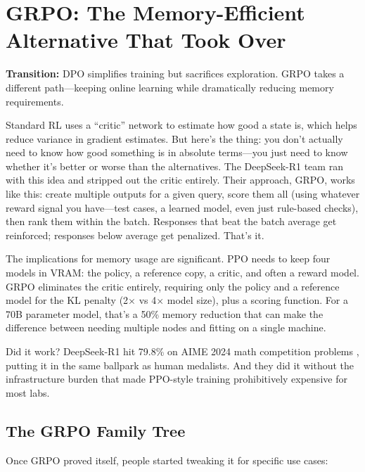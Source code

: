 \documentclass[12pt,a4paper]{report}
\theoremstyle{definition}
\begin{document}
\section{GRPO: The Memory-Efficient Alternative That Took Over}
\label{sec:grpo}
\textbf{Transition:} DPO simplifies training but sacrifices exploration. GRPO takes a different path---keeping online learning while dramatically reducing memory requirements.

Standard RL uses a ``critic'' network to estimate how good a state is, which helps reduce variance in gradient estimates. But here's the thing: you don't actually need to know how good something is in absolute terms---you just need to know whether it's better or worse than the alternatives. The DeepSeek-R1 team \cite{deepseek2025r1} ran with this idea and stripped out the critic entirely. Their approach, GRPO, works like this: create multiple outputs for a given query, score them all
 (using whatever reward signal you have---test cases, a learned model, even just rule-based checks), then rank them within the batch. Responses that beat the batch average get reinforced; responses below average get penalized. That's it.

The implications for memory usage are significant. PPO needs to keep four models in VRAM: the policy, a reference copy, a critic, and often a reward model. GRPO eliminates the critic entirely, requiring only the policy and a reference model for the KL penalty (2$\times$ vs 4$\times$ model size), plus a scoring function. For a 70B parameter model, that's a 50\% memory reduction that can make the difference between needing multiple nodes and fitting on a single machine.

Did it work? DeepSeek-R1 hit 79.8\% on AIME 2024 math competition problems \cite{deepseek2025r1}, putting it in the same ballpark as human medalists. And they did it without the infrastructure burden that made PPO-style training prohibitively expensive for most labs.

\subsection{The GRPO Family Tree}
Once GRPO proved itself, people started tweaking it for specific use cases:
\end{document}

